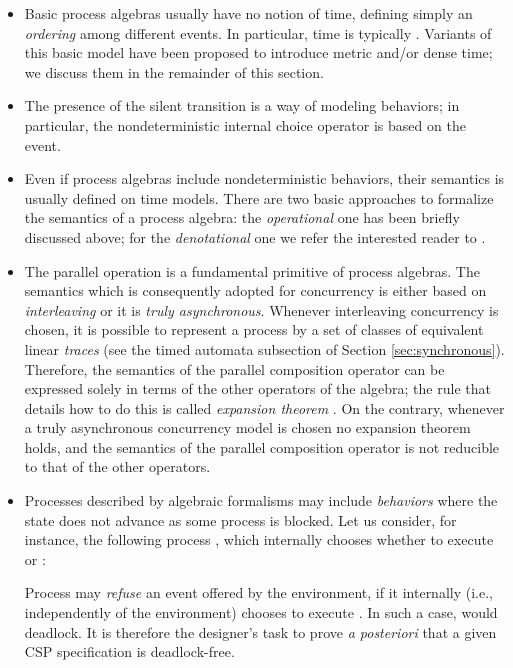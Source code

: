 \begin{itemize}
\item Basic process algebras usually have no  notion of 
time, defining simply an \emph{ordering} among different events. 
In particular, time is typically  \cite{Bae04}. Variants 
of this basic model have been proposed to introduce metric and/or 
dense time; we discuss them in the remainder of this section.

\item The presence of the silent transition  is a way of modeling 
 behaviors; in particular, the nondeterministic internal 
choice operator  is based on the  event.

\item Even if process algebras include nondeterministic behaviors, 
their semantics is usually defined on  time models. 
There are two basic approaches to formalize the semantics of 
a process algebra: the \emph{operational} one has been briefly discussed 
above; for the \emph{denotational} one we refer the interested reader 
to \cite{Sch00}.

\item The parallel  operation is a fundamental primitive 
of process algebras. The semantics which is consequently adopted 
for concurrency is either based on \emph{interleaving} or it is \emph{truly asynchronous}.
Whenever interleaving concurrency is chosen, it 
is possible to represent a process by a set of classes of equivalent 
linear \emph{traces} (see the timed automata subsection of Section \ref{sec:synchronous}). 
Therefore, the semantics of the parallel composition operator 
can be expressed solely in terms of the other operators of the 
algebra; the rule that details how to do this is called \emph{expansion theorem} \cite{Bae04}.
On the contrary, whenever a truly asynchronous 
concurrency model is chosen no expansion theorem holds, and the 
semantics of the parallel composition operator is not reducible 
to that of the other operators.



\item Processes described by algebraic formalisms may include  \emph{behaviors}
where the state does not advance as some process is blocked. 
Let us consider, for instance, the following process , 
which internally chooses whether to execute  or :

Process  may \emph{refuse} an  event offered by 
the environment, if it internally (i.e., independently of the 
environment) chooses to execute . In such a 
case,  would deadlock. It is therefore the designer's 
task to prove \emph{a posteriori} that a given CSP specification 
is deadlock-free.
\end{itemize}

